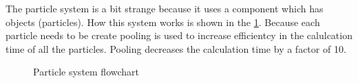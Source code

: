 \documentclass{projdoc}
\begin{document}
The particle system is a bit strange because it uses a component which has objects
(particles). How this system works is shown in the
\cref{fig:particle-system-flowchart}. Because each particle needs to be create
pooling is used to increase efficientcy in the calulcation time of all the particles.
Pooling decreases the calculation time by a factor of 10.

\begin{figure}
	\centering
	\caption{Particle system flowchart}
	\label{fig:particle-system-flowchart}
\end{figure}
\end{document}

